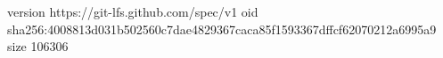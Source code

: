 version https://git-lfs.github.com/spec/v1
oid sha256:4008813d031b502560c7dae4829367caca85f1593367dffcf62070212a6995a9
size 106306
